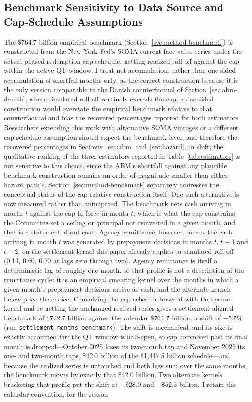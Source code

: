 \documentclass[12pt]{article}
\begin{document}
\subsection{Benchmark Sensitivity to Data Source and Cap-Schedule Assumptions}\label{sec:robustness-benchmark}

The \$764.7 billion empirical benchmark (Section~\ref{sec:method-benchmark}) is constructed from the New York Fed's SOMA current-face-value series under the actual phased redemption cap schedule, netting realized roll-off against the cap within the active QT window. I treat net accumulation, rather than one-sided accumulation of shortfall months only, as the correct construction because it is the only version comparable to the Danish counterfactual of Section~\ref{sec:abm-danish}, where simulated roll-off routinely exceeds the cap; a one-sided construction would overstate the empirical benchmark relative to that counterfactual and bias the recovered percentages reported for both estimators. Researchers extending this work with alternative SOMA vintages or a different cap-schedule assumption should expect the benchmark level, and therefore the recovered percentages in Sections~\ref{sec:abm} and~\ref{sec:hazard}, to shift; the qualitative ranking of the three estimators reported in Table~\ref{tab:estimators} is not sensitive to this choice, since the ABM's shortfall against any plausible benchmark construction remains an order of magnitude smaller than either hazard path's. Section~\ref{sec:method-benchmark} separately addresses the conceptual status of the cap-relative construction itself. One such alternative is now measured rather than anticipated. The benchmark nets cash arriving in month $t$ against the cap in force in month $t$, which is what the cap constrains: the Committee set a ceiling on principal not reinvested in a given month, and that is a statement about cash. Agency remittance, however, means the cash arriving in month $t$ was generated by prepayment decisions in months $t$, $t-1$ and $t-2$, on the settlement kernel this paper already applies to simulated roll-off (0.10, 0.60, 0.30 at lags zero through two). Agency remittance is itself a deterministic lag of roughly one month, so that profile is not a description of the remittance cycle: it is an empirical smearing kernel over the months in which a given month's prepayment decisions arrive as cash, and the alternate kernels below price the choice. Convolving the cap schedule forward with that same kernel and re-netting the unchanged realized series gives a settlement-aligned benchmark of \$722.7 billion against the calendar \$764.7 billion, a shift of $-5.5$\% (run \texttt{settlement\_months\_benchmark}). The shift is mechanical, and its size is exactly accounted for: the QT window is half-open, so cap convolved past its final month is dropped---October 2025 loses its two-month tap and November 2025 its one- and two-month taps, \$42.0 billion of the \$1{,}417.5 billion schedule---and because the realized series is untouched and both legs sum over the same months, the benchmark moves by exactly that \$42.0 billion. Two alternate kernels bracketing that profile put the shift at $-\$28.0$ and $-\$52.5$ billion. I retain the calendar convention, for the reason 
\end{document}
